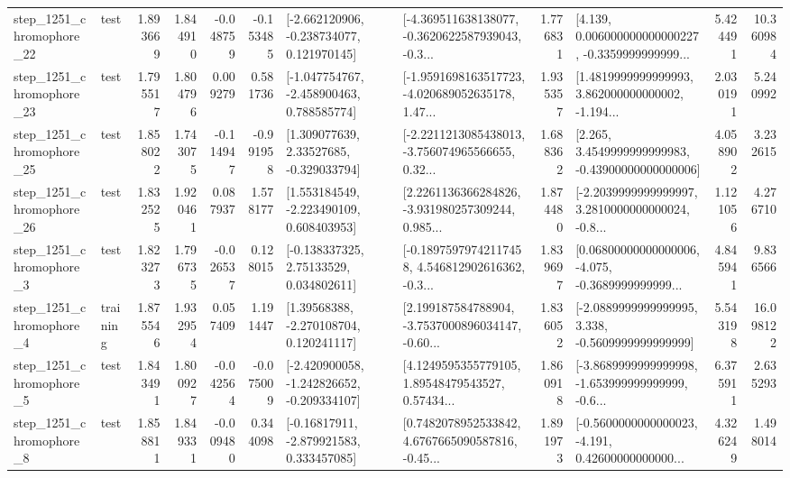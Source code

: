 \begin{tabular}{llrrrrllrlrr}
 step\_1251\_chromophore\_22 &      test &      1.893669 &    1.844910 &     -0.048759 & -0.153485 &   [-2.662120906, -0.238734077, 0.121970145] &  [-4.369511638138077, -0.3620622587939043, -0.3... &       1.776831 &  [4.139, 0.006000000000000227, -0.3359999999999... &            5.424491 &         10.360984 \\
 step\_1251\_chromophore\_23 &      test &      1.795517 &    1.804796 &      0.009279 &  0.581736 &   [-1.047754767, -2.458900463, 0.788585774] &  [-1.9591698163517723, -4.020689052635178, 1.47... &       1.935357 &  [1.4819999999999993, 3.862000000000002, -1.194... &            2.030191 &          5.240992 \\
 step\_1251\_chromophore\_25 &      test &      1.858022 &    1.743075 &     -0.114947 & -0.991958 &     [1.309077639, 2.33527685, -0.329033794] &  [-2.2211213085438013, -3.756074965566655, 0.32... &       1.688362 &  [2.265, 3.4549999999999983, -0.43900000000000006] &            4.058902 &          3.232615 \\
 step\_1251\_chromophore\_26 &      test &      1.832525 &    1.920461 &      0.087937 &  1.578177 &    [1.553184549, -2.223490109, 0.608403953] &  [2.2261136366284826, -3.931980257309244, 0.985... &       1.874480 &  [-2.2039999999999997, 3.2810000000000024, -0.8... &            1.121056 &          4.276710 \\
  step\_1251\_chromophore\_3 &      test &      1.823273 &    1.796735 &     -0.026537 &  0.128015 &     [-0.138337325, 2.75133529, 0.034802611] &  [-0.18975979742117458, 4.546812902616362, -0.3... &       1.839697 &  [0.06800000000000006, -4.075, -0.3689999999999... &            4.845941 &          9.836566 \\
  step\_1251\_chromophore\_4 &  training &      1.875546 &    1.932954 &      0.057409 &  1.191447 &     [1.39568388, -2.270108704, 0.120241117] &  [2.199187584788904, -3.7537000896034147, -0.60... &       1.836052 &  [-2.0889999999999995, 3.338, -0.5609999999999999] &            5.543198 &         16.098122 \\
  step\_1251\_chromophore\_5 &      test &      1.843491 &    1.800927 &     -0.042564 & -0.075009 &  [-2.420900058, -1.242826652, -0.209334107] &  [4.1249595355779105, 1.89548479543527, 0.57434... &       1.860918 &  [-3.8689999999999998, -1.653999999999999, -0.6... &            6.375911 &          2.635293 \\
  step\_1251\_chromophore\_8 &      test &      1.858811 &    1.849331 &     -0.009480 &  0.344098 &    [-0.16817911, -2.879921583, 0.333457085] &  [0.7482078952533842, 4.6767665090587816, -0.45... &       1.891973 &  [-0.5600000000000023, -4.191, 0.42600000000000... &            4.326249 &          1.498014 \\

\end{tabular}
